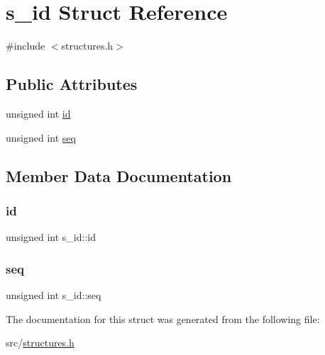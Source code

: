 \hypertarget{structs__id}{}\section{s\+\_\+id Struct Reference}
\label{structs__id}


{\ttfamily \#include $<$structures.\+h$>$}

\subsection*{Public Attributes}
\begin{DoxyCompactItemize}
\item 
unsigned int \hyperlink{structs__id_a5c4ca3342296868576159a20ebe9909d}{id}
\item 
unsigned int \hyperlink{structs__id_aa384054b68c5bfb4ed4a230e6a0e895f}{seq}
\end{DoxyCompactItemize}


\subsection{Member Data Documentation}
\mbox{\label{structs__id_a5c4ca3342296868576159a20ebe9909d}} 
\subsubsection{\texorpdfstring{id}{id}}
{\footnotesize\ttfamily unsigned int s\+\_\+id\+::id}

\mbox{\label{structs__id_aa384054b68c5bfb4ed4a230e6a0e895f}} 
\subsubsection{\texorpdfstring{seq}{seq}}
{\footnotesize\ttfamily unsigned int s\+\_\+id\+::seq}



The documentation for this struct was generated from the following file\+:\begin{DoxyCompactItemize}
\item 
src/\hyperlink{structures_8h}{structures.\+h}\end{DoxyCompactItemize}

